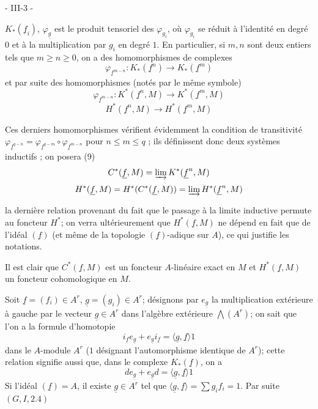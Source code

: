 \newpage


- III-3 -

$K_*(\underline{f}_i)$, $\varphi_{\underline{g}}$ est le produit tensoriel des $\varphi_{g_i}$, où $\varphi_{g_i}$ se réduit
à l'identité en degré $0$ et à la multiplication par $g_i$ en degré $1$.
En particulier, si $m, n$ sont deux entiers tels que $m \geq n \geq 0$, on a
des homomorphismes de complexes
$$\varphi_{\underline{f}^{m-n}} : K_*(\underline{f}^n) \to K_*(\underline{f}^m)$$
et par suite des homomorphismes (notés par le même symbole)
$$\varphi_{\underline{f}^{m-n}} : K^*(\underline{f}^n, M) \to K^*(\underline{f}^m, M)$$
$$H^*(\underline{f}^n, M) \to H^*(\underline{f}^m, M)$$

Ces derniers homomorphismes vérifient évidemment la condition de
transitivité $\varphi_{\underline{f}^{q-n}} = \varphi_{\underline{f}^{q-m}} \circ \varphi_{\underline{f}^{m-n}}$ pour $n \leq m \leq q$ ; ils définissent
donc deux systèmes inductifs ; on posera
(9)
$$C^*(\underline{f}, M) = \varinjlim K^*(\underline{f}^n, M)$$
$$H^*(\underline{f}, M) = H^*(C^*(\underline{f}, M)) = \varinjlim H^*(\underline{f}^n, M)$$

la dernière relation provenant du fait que le passage à la limite
inductive permute au foncteur $H^*$; on verra ultérieurement que
$H^*(\underline{f}, M)$ ne dépend en fait que de l'idéal $(\underline{f})$ (et même de la topologie $(\underline{f})$-adique sur $A$), ce qui justifie les notations.

Il est clair que $C^*(\underline{f}, M)$ est un foncteur $A$-linéaire exact en $M$ et
$H^*(\underline{f}, M)$ un foncteur cohomologique en $M$.

Soit $\underline{f}=(f_i) \in A^r$, $\underline{g}=(g_i) \in A^r$; désignons par
$e_{\underline{g}}$ la multiplication extérieure à gauche par le vecteur $\underline{g} \in A^r$ dans
l'algèbre extérieure $\bigwedge(A^r)$; on sait que l'on a la formule d'homotopie
$$i_{\underline{f}} e_{\underline{g}} + e_{\underline{g}} i_{\underline{f}} = \langle \underline{g}, \underline{f} \rangle 1$$
dans le $A$-module $A^r$ ($1$ désignant l'automorphisme identique de $A^r$);
cette relation signifie aussi que, dans le complexe $K_*(\underline{f})$, on a
$$d e_{\underline{g}} + e_{\underline{g}} d = \langle \underline{g}, \underline{f} \rangle 1$$
Si l'idéal $(\underline{f})=A$, il existe $\underline{g} \in A^r$ tel que $\langle \underline{g}, \underline{f} \rangle = \sum g_i f_i = 1$. Par suite
$(G, I, 2.4)$


